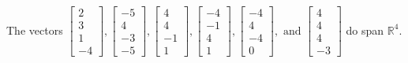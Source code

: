 \begin{exercise}
\begin{exerciseStatement}
  \end{exerciseStatement}
  \begin{exerciseAnswer}
   The vectors \(\left[\begin{array}{r}
2 \\
3 \\
1 \\
-4
\end{array}\right] , \left[\begin{array}{r}
-5 \\
4 \\
-3 \\
-5
\end{array}\right] , \left[\begin{array}{r}
4 \\
4 \\
-1 \\
1
\end{array}\right] , \left[\begin{array}{r}
-4 \\
-1 \\
4 \\
1
\end{array}\right] , \left[\begin{array}{r}
-4 \\
4 \\
-4 \\
0
\end{array}\right] , \text{ and } \left[\begin{array}{r}
4 \\
4 \\
4 \\
-3
\end{array}\right]\) 
  	 do  
	span \(\mathbb{R}^4\).
  


  \end{exerciseAnswer}
\end{exercise}